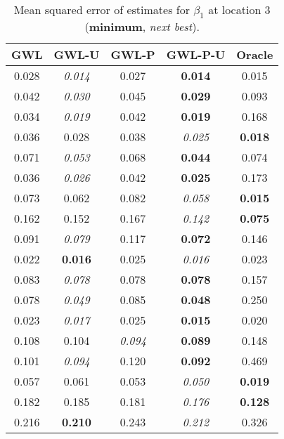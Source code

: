 \documentclass[authoryear, review, 11pt]{elsarticle}
\begin{document}
\begin{table}[ht]
\begin{center}
\begin{tabular}{ccccc}
 GWL & GWL-U & GWL-P & GWL-P-U & Oracle \\ 
  \hline
0.028 & \emph{0.014} & 0.027 & \textbf{0.014} & 0.015 \\ 
  0.042 & \emph{0.030} & 0.045 & \textbf{0.029} & 0.093 \\ 
  0.034 & \emph{0.019} & 0.042 & \textbf{0.019} & 0.168 \\ 
  0.036 & 0.028 & 0.038 & \emph{0.025} & \textbf{0.018} \\ 
  0.071 & \emph{0.053} & 0.068 & \textbf{0.044} & 0.074 \\ 
  0.036 & \emph{0.026} & 0.042 & \textbf{0.025} & 0.173 \\ 
  0.073 & 0.062 & 0.082 & \emph{0.058} & \textbf{0.015} \\ 
  0.162 & 0.152 & 0.167 & \emph{0.142} & \textbf{0.075} \\ 
  0.091 & \emph{0.079} & 0.117 & \textbf{0.072} & 0.146 \\ 
  0.022 & \textbf{0.016} & 0.025 & \emph{0.016} & 0.023 \\ 
  0.083 & \emph{0.078} & 0.078 & \textbf{0.078} & 0.157 \\ 
  0.078 & \emph{0.049} & 0.085 & \textbf{0.048} & 0.250 \\ 
  0.023 & \emph{0.017} & 0.025 & \textbf{0.015} & 0.020 \\ 
  0.108 & 0.104 & \emph{0.094} & \textbf{0.089} & 0.148 \\ 
  0.101 & \emph{0.094} & 0.120 & \textbf{0.092} & 0.469 \\ 
  0.057 & 0.061 & 0.053 & \emph{0.050} & \textbf{0.019} \\ 
  0.182 & 0.185 & 0.181 & \emph{0.176} & \textbf{0.128} \\ 
  0.216 & \textbf{0.210} & 0.243 & \emph{0.212} & 0.326 \\ 
  \end{tabular}
\caption{Mean squared error of estimates for $\beta_1$ at location 3 (\textbf{minimum}, \emph{next best}).\label{MSEX-nonzero}}
\end{center}
\end{table}
\end{document}
